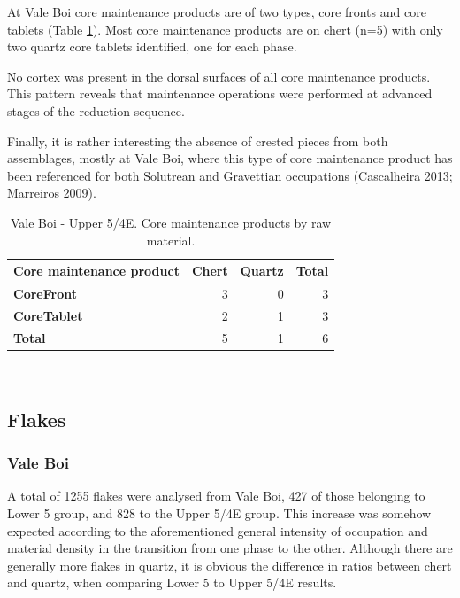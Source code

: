 \documentclass[12pt,twoside]{reedthesis}
\begin{document}
At Vale Boi core maintenance products are of two types, core fronts and core tablets (Table \ref{tab:corepreptypeVB}). Most core maintenance products are on chert (n=5) with only two quartz core tablets identified, one for each phase.

No cortex was present in the dorsal surfaces of all core maintenance products. This pattern reveals that maintenance operations were performed at advanced stages of the reduction sequence.

Finally, it is rather interesting the absence of crested pieces from both assemblages, mostly at Vale Boi, where this type of core maintenance product has been referenced for both Solutrean and Gravettian occupations (Cascalheira 2013; Marreiros 2009).
\begin{table}[!h]

\caption{\label{tab:corepreptypeVB}Vale Boi - Upper 5/4E. Core maintenance products by raw material.}
\centering
\fontsize{9}{11}\selectfont
\begin{tabular}[t]{>{\bfseries}lrrr}
\toprule
Core maintenance product & Chert & Quartz & Total\\
\midrule
CoreFront & 3 & 0 & 3\\
CoreTablet & 2 & 1 & 3\\
Total & 5 & 1 & 6\\
\bottomrule
\end{tabular}
\end{table}
~

\hypertarget{flakes}{%
\subsection{Flakes}\label{flakes}}

\hypertarget{vale-boi-5}{%
\subsubsection{Vale Boi}\label{vale-boi-5}}

A total of 1255 flakes were analysed from Vale Boi, 427 of those belonging to Lower 5 group, and 828 to the Upper 5/4E group. This increase was somehow expected according to the aforementioned general intensity of occupation and material density in the transition from one phase to the other. Although there are generally more flakes in quartz, it is obvious the difference in ratios between chert and quartz, when comparing Lower 5 to Upper 5/4E results.
\end{document}
